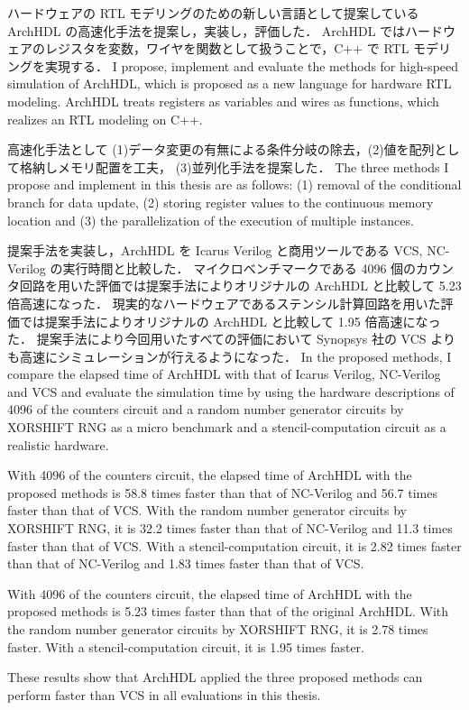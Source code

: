 ハードウェアの RTL モデリングのための新しい言語として提案している ArchHDL の高速化手法を提案し，実装し，評価した．
ArchHDL ではハードウェアのレジスタを変数，ワイヤを関数として扱うことで，C++ で RTL モデリングを実現する．
\fi
I propose, implement and evaluate the methods for high-speed simulation of ArchHDL, which is proposed as a new language for hardware RTL modeling.
ArchHDL treats registers as variables and wires as functions, which realizes an RTL modeling on C++.

高速化手法として (1)データ変更の有無による条件分岐の除去，(2)値を配列として格納しメモリ配置を工夫，
(3)並列化手法を提案した．
\fi
The three methods I propose and implement in this thesis are as follows:
(1) removal of the conditional branch for data update,
(2) storing register values to the continuous memory location
and (3) the parallelization of the execution of multiple instances.

提案手法を実装し，ArchHDL を Icarus Verilog と商用ツールである VCS, NC-Verilog の実行時間と比較した．
マイクロベンチマークである 4096 個のカウンタ回路を用いた評価では提案手法によりオリジナルの ArchHDL と比較して 5.23 倍高速になった．
現実的なハードウェアであるステンシル計算回路を用いた評価では提案手法によりオリジナルの ArchHDL と比較して 1.95 倍高速になった．
提案手法により今回用いたすべての評価において Synopsys 社の VCS よりも高速にシミュレーションが行えるようになった．
\fi
In the proposed methods,
I compare the elapsed time of ArchHDL with that of Icarus Verilog, NC-Verilog and VCS
and evaluate the simulation time by using the hardware descriptions of 4096 of the counters circuit and a random number generator circuits by XORSHIFT RNG as a micro benchmark and a stencil-computation circuit as a realistic hardware.

With 4096 of the counters circuit, the elapsed time of ArchHDL with the proposed methods is 58.8 times faster than that of NC-Verilog and 56.7 times faster than that of VCS.
With the random number generator circuits by XORSHIFT RNG, it is 32.2 times faster than that of NC-Verilog and 11.3 times faster than that of VCS.
With a stencil-computation circuit, it is 2.82 times faster than that of NC-Verilog and 1.83 times faster than that of VCS.

With 4096 of the counters circuit, the elapsed time of ArchHDL with the proposed methods is 5.23 times faster than that of the original ArchHDL.
With the random number generator circuits by XORSHIFT RNG, it is 2.78 times faster.
With a stencil-computation circuit, it is 1.95 times faster.


These results show that ArchHDL applied the three proposed methods can perform faster than VCS in all evaluations in this thesis.
